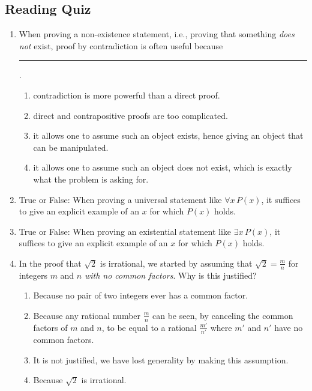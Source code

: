 \subsection*{Reading Quiz}

\begin{enumerate}
  
  \item When proving a non-existence statement, i.e., proving that something \emph{does not} exist, proof by contradiction is often useful because \rule{5cm}{0.15mm}.
  
  \begin{enumerate}
      \item contradiction is more powerful than a direct proof.
      \item direct and contrapositive proofs are too complicated.
      \item it allows one to assume such an object exists, hence giving an object that can be manipulated.
      \item it allows one to assume such an object does not exist, which is exactly what the problem is asking for.
  \end{enumerate}
  
  \item True or False: When proving a universal statement like $\forall x\, P(x)$, it suffices to give an explicit example of an $x$ for which $P(x)$ holds.

  \item True or False: When proving an existential statement like $\exists x\, P(x)$, it suffices to give an explicit example of an $x$ for which $P(x)$ holds.

  \item In the proof that $\sqrt{2}$ is irrational, we started by assuming that $\sqrt{2} = \frac{m}{n}$ for integers $m$ and $n$ \emph{with no common factors}. Why is this justified?

  \begin{enumerate}
      \item Because no pair of two integers ever has a common factor.
      \item Because any rational number $\frac{m}{n}$ can be seen, by canceling the common factors of $m$ and $n$, to be equal to a rational $\frac{m'}{n'}$ where $m'$ and $n'$ have no common factors.
      \item It is not justified, we have lost generality by making this assumption.
      \item Because $\sqrt{2}$ is irrational.
  \end{enumerate}
  

\end{enumerate}
